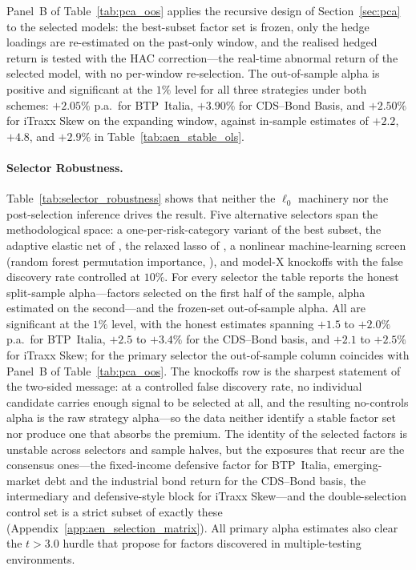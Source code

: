 Panel~B of Table~\ref{tab:pca_oos} applies the recursive design of
Section~\ref{sec:pca} to the selected models: the best-subset factor
set is frozen, only the hedge loadings are re-estimated on the
past-only window, and the realised hedged return is tested with the
HAC correction---the real-time abnormal return of the selected model,
with no per-window re-selection. The out-of-sample alpha is positive
and significant at the $1\%$ level for all three strategies under
both schemes: $+2.05\%$ p.a.\ for BTP~Italia, $+3.90\%$ for
CDS--Bond Basis, and $+2.50\%$ for iTraxx Skew on the expanding
window, against in-sample estimates of $+2.2$, $+4.8$, and $+2.9\%$
in Table~\ref{tab:aen_stable_ols}.

\paragraph{Selector Robustness.}

Table~\ref{tab:selector_robustness} shows that neither the $\ell_0$
machinery nor the post-selection inference drives the result. Five
alternative selectors span the methodological space: a
one-per-risk-category variant of the best subset, the adaptive
elastic net of \citet{zou2009adaptive}, the relaxed lasso of
\citet{meinshausen2007relaxed}, a nonlinear machine-learning screen
(random forest permutation importance, \citealp{breiman2001random}),
and model-X knockoffs \citep{candes2018panning} with the
false discovery rate controlled at $10\%$. For every selector the
table reports the honest split-sample alpha---factors selected on the
first half of the sample, alpha estimated on the second---and the
frozen-set out-of-sample alpha. All are significant at the $1\%$
level, with the honest estimates spanning $+1.5$ to $+2.0\%$ p.a.\
for BTP~Italia, $+2.5$ to $+3.4\%$ for the CDS--Bond basis, and
$+2.1$ to $+2.5\%$ for iTraxx Skew; for the primary selector the
out-of-sample column coincides with Panel~B of
Table~\ref{tab:pca_oos}. The knockoffs row is the sharpest statement
of the two-sided message: at a controlled false discovery rate, no
individual candidate carries enough signal to be selected at all, and
the resulting no-controls alpha is the raw strategy alpha---so the
data neither identify a stable factor set nor produce one that
absorbs the premium. The identity of the selected factors is
unstable across selectors and sample halves, but the exposures that
recur are the consensus ones---the fixed-income defensive factor for
BTP~Italia, emerging-market debt and the industrial bond return for
the CDS--Bond basis, the intermediary and defensive-style block for
iTraxx Skew---and the double-selection control set is a strict
subset of exactly these
(Appendix~\ref{app:aen_selection_matrix}). All primary alpha
estimates also clear the $t > 3.0$ hurdle that
\citet{harvey2016and} propose for factors discovered in
multiple-testing environments.



